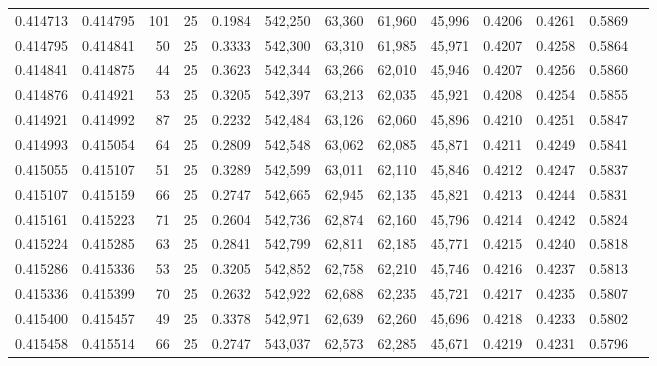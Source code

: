 \begin{tabular}{rrrrrrrrrrrrr}
0.414713 & 0.414795 &   101 &  25 &                                     0.1984 & 542,250 &  63,360 &  61,960 &  45,996 & 0.4206 & 0.4261 & 0.5869 \\
0.414795 & 0.414841 &    50 &  25 &                                     0.3333 & 542,300 &  63,310 &  61,985 &  45,971 & 0.4207 & 0.4258 & 0.5864 \\
0.414841 & 0.414875 &    44 &  25 &                                     0.3623 & 542,344 &  63,266 &  62,010 &  45,946 & 0.4207 & 0.4256 & 0.5860 \\
0.414876 & 0.414921 &    53 &  25 &                                     0.3205 & 542,397 &  63,213 &  62,035 &  45,921 & 0.4208 & 0.4254 & 0.5855 \\
0.414921 & 0.414992 &    87 &  25 &                                     0.2232 & 542,484 &  63,126 &  62,060 &  45,896 & 0.4210 & 0.4251 & 0.5847 \\
0.414993 & 0.415054 &    64 &  25 &                                     0.2809 & 542,548 &  63,062 &  62,085 &  45,871 & 0.4211 & 0.4249 & 0.5841 \\
0.415055 & 0.415107 &    51 &  25 &                                     0.3289 & 542,599 &  63,011 &  62,110 &  45,846 & 0.4212 & 0.4247 & 0.5837 \\
0.415107 & 0.415159 &    66 &  25 &                                     0.2747 & 542,665 &  62,945 &  62,135 &  45,821 & 0.4213 & 0.4244 & 0.5831 \\
0.415161 & 0.415223 &    71 &  25 &                                     0.2604 & 542,736 &  62,874 &  62,160 &  45,796 & 0.4214 & 0.4242 & 0.5824 \\
0.415224 & 0.415285 &    63 &  25 &                                     0.2841 & 542,799 &  62,811 &  62,185 &  45,771 & 0.4215 & 0.4240 & 0.5818 \\
0.415286 & 0.415336 &    53 &  25 &                                     0.3205 & 542,852 &  62,758 &  62,210 &  45,746 & 0.4216 & 0.4237 & 0.5813 \\
0.415336 & 0.415399 &    70 &  25 &                                     0.2632 & 542,922 &  62,688 &  62,235 &  45,721 & 0.4217 & 0.4235 & 0.5807 \\
0.415400 & 0.415457 &    49 &  25 &                                     0.3378 & 542,971 &  62,639 &  62,260 &  45,696 & 0.4218 & 0.4233 & 0.5802 \\
0.415458 & 0.415514 &    66 &  25 &                                     0.2747 & 543,037 &  62,573 &  62,285 &  45,671 & 0.4219 & 0.4231 & 0.5796 \\

\end{tabular}
